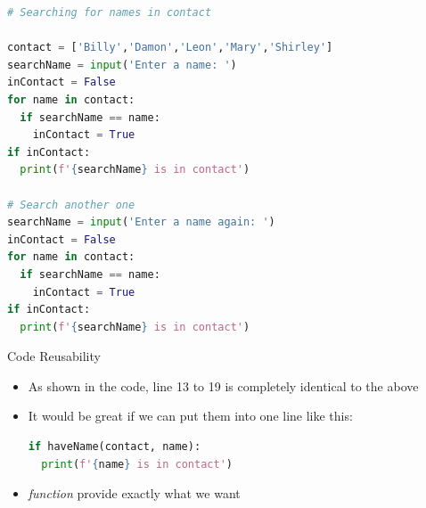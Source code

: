 \documentclass[10pt,xcolor={table,dvipsnames},t]{beamer}
\begin{document}
\begin{frame}[fragile]
\begin{lstlisting}[language=python]
# Searching for names in contact

contact = ['Billy','Damon','Leon','Mary','Shirley']
searchName = input('Enter a name: ')
inContact = False 
for name in contact:
  if searchName == name:
    inContact = True 
if inContact:
  print(f'{searchName} is in contact')

# Search another one
searchName = input('Enter a name again: ')
inContact = False 
for name in contact:
  if searchName == name:
    inContact = True 
if inContact:
  print(f'{searchName} is in contact')
  \end{lstlisting}
\end{frame}

\begin{frame}[fragile]{Code Reusability}
  \begin{itemize}
    \item As shown in the code, line 13 to 19 is completely identical to the above
    \item It would be great if we can put them into one line like this:
\begin{lstlisting}[language=python]
if haveName(contact, name):
  print(f'{name} is in contact')
\end{lstlisting}
    \item \textit{function} provide exactly what we want
  \end{itemize}
\end{frame}
\end{document}
